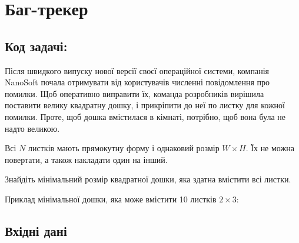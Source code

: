 \documentclass[12pt,a4paper]{article}
\begin{document}
\section*{Баг-трекер \hfill {}}


\subsection*{Код задачі: }

Після швидкого випуску нової версії своєї операційної системи, компанія NanoSoft почала отримувати від користувачів численні повідомлення про помилки.
Щоб оперативно виправити їх, команда розробників вирішила поставити велику квадратну дошку, і прикріпити до неї по листку для кожної помилки.
Проте, щоб дошка вмістилася в кімнаті, потрібно, щоб вона була не надто великою.

Всі \(N\) листків мають прямокутну форму і однаковий розмір \(W \times H\). Їх не можна повертати, а також накладати один на інший.

Знайдіть мінімальний розмір квадратної дошки, яка здатна вмістити всі листки.

Приклад мінімальної дошки, яка може вмістити 10 листків \(2 \times 3\):

\begin{center}
\end{center}


\subsection*{Вхідні дані}
\end{document}
